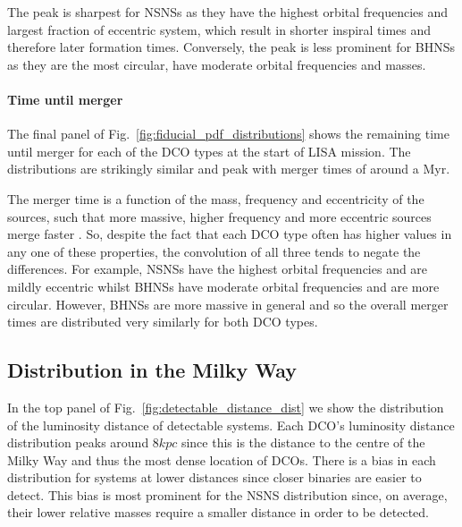 The peak is sharpest for NSNSs as they have the highest orbital frequencies and largest fraction of eccentric system, which result in shorter inspiral times and therefore later formation times. Conversely, the peak is less prominent for BHNSs as they are the most circular, have moderate orbital frequencies and masses.

\paragraph{Time until merger} The final panel of Fig.~\ref{fig:fiducial_pdf_distributions} shows the remaining time until merger for each of the DCO types at the start of LISA mission. The distributions are strikingly similar and peak with merger times of around a Myr.

The merger time is a function of the mass, frequency and eccentricity of the sources, such that more massive, higher frequency and more eccentric sources merge faster \citep[][Eq.~5.14]{Peters+1964}. So, despite the fact that each DCO type often has higher values in any one of these properties, the convolution of all three tends to negate the differences. For example, NSNSs have the highest orbital frequencies and are mildly eccentric whilst BHNSs have moderate orbital frequencies and are more circular. However, BHNSs are more massive in general and so the overall merger times are distributed very similarly for both DCO types.

\subsection{Distribution in the Milky Way}\label{sec:mw_detectable_distribution}
In the top panel of Fig.~\ref{fig:detectable_distance_dist} we show the distribution of the luminosity distance of detectable systems. Each DCO's luminosity distance distribution peaks around $8 \unit{kpc}$ since this is the distance to the centre of the Milky Way and thus the most dense location of DCOs. There is a bias in each distribution for systems at lower distances since closer binaries are easier to detect. This bias is most prominent for the NSNS distribution since, on average, their lower relative masses require a smaller distance in order to be detected.

